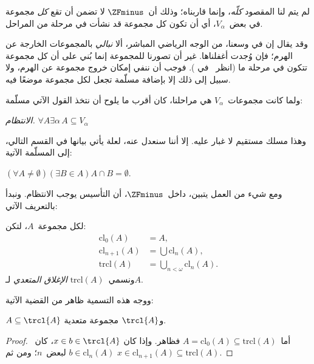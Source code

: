 \documentclass[../../../include/open-logic-section]{subfiles}
\begin{document}


لم يتم لنا المقصود \emph{كلّه}، وإنما قاربناه؛ وذلك أن~$\ZFminus$
لا تضمن أن تقع \emph{كل} مجموعة في بعض~$V_\alpha$، أي أن تكون كل
مجموعة قد نشأت في مرحلة من المراحل.

وقد يقال إن في وسعنا، من الوجه الرياضي المباشر، ألا \emph{نبالي}
بالمجموعات الخارجة عن الهرم؛ فإن وُجدت أغفلناها. غير أن تصورنا للمجموعة
إنما بُني على أن كل مجموعة تتكون في مرحلة ما (انظر~\stageshier{} في
). فوجب أن ننفي إمكان خروج مجموعة عن الهرم، ولا
سبيل إلى ذلك إلا بإضافة مسلّمة تجعل لكل مجموعة موضعًا فيه.

ولما كانت مجموعات~$V_\alpha$ هي مراحلنا، كان أقرب ما يلوح أن نتخذ
القول الآتي مسلّمة:

\begin{defish}
\emph{الانتظام.} $\forall A \exists \alpha\, A \subseteq V_\alpha$
\end{defish}

وهذا مسلك مستقيم لا غبار عليه. إلا أننا سنعدل عنه، لعلة يأتي بيانها في
القسم التالي، إلى المسلّمة الآتية:

\begin{axiom}[التأسيس]
$(\forall A \neq \emptyset)(\exists B \in A)A \cap B = \emptyset$.
\end{axiom}

ومع شيء من العمل يتبين، داخل~$\ZFminus$، أن التأسيس يوجب الانتظام.
ونبدأ بالتعريف الآتي:
\begin{defn}
لكل مجموعة~$A$، لتكن:
\begin{align*}
	\text{cl}_0(A) &= A,\\
	\text{cl}_{n+1}(A) &= \bigcup \text{cl}_n(A),\\
	\text{trcl}(A) &= \bigcup_{n < \omega} \text{cl}_{n}(A).
\end{align*}
ونسمي~$\text{trcl}(A)$ \emph{الإغلاق المتعدي} لـ$A$.
\end{defn}
\noindent
ووجه هذه التسمية ظاهر من القضية الآتية:
\begin{prop}
$A \subseteq \trcl{A}$ و$\trcl{A}$ مجموعة متعدية.
\end{prop}

\begin{proof}
أما~$A = \text{cl}_0(A) \subseteq \text{trcl}(A)$ فظاهر. وإذا كان
$x \in b \in \trcl{A}$، كان~$b \in \text{cl}_n(A)$ لبعض~$n$؛ ومن ثم
$x \in \text{cl}_{n+1}(A) \subseteq \text{trcl}(A)$.
\end{proof}
\end{document}

